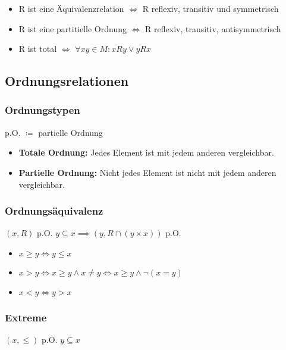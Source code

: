 \documentclass[12pt]{scrreprt}
\begin{document}
                    \begin{itemize}
                        \item R ist eine Äquivalenzrelation $ \iff $ R reflexiv, transitiv und symmetrisch
                        \item R ist eine partitielle Ordnung $ \iff $ R reflexiv, transitiv, antisymmetrisch
                        \item R ist total $ \iff $ $ \forall x y \in M : xRy \lor yRx $
                    \end{itemize}


            \subsection{Ordnungsrelationen}
                \subsubsection{Ordnungstypen}
                    p.O. $ \coloneqq $ partielle Ordnung

                    \begin{itemize}
                        \item \textbf{Totale Ordnung:} Jedes Element ist mit jedem anderen vergleichbar.
                        \item \textbf{Partielle Ordnung:} Nicht jedes Element ist nicht mit jedem anderen vergleichbar.
                    \end{itemize}


                \subsubsection{Ordnungsäquivalenz}
                    $ (x, R) $ p.O. $ y \subseteq x \implies (y, R \cap (y \times x)) $ p.O.

                    \begin{itemize}
                        \item $ x \geq y \iff y \leq x $
                        \item $ x > y \iff x \geq y \land x \neq y \iff x \geq y \land \lnot (x = y) $
                        \item $ x < y \iff y > x $
                    \end{itemize}


                \subsubsection{Extreme}
                    $ (x, \leq) $ p.O. $ y \subseteq x $
\end{document}
